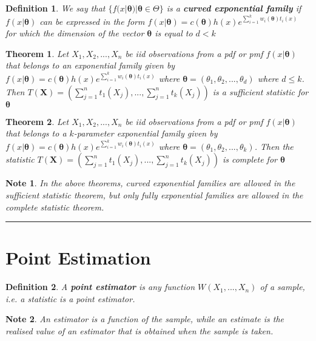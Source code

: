 \documentclass[14pt,twoside]{extreport}
\newcommand{\hhrule}{\vspace{1cm}\hrule\vspace{1cm}}
\theoremstyle{dotless}
\newtheorem*{defn}{Definition}
\newtheorem*{thm}{Theorem} %
\newtheorem*{note}{Note} %
\begin{document}
\begin{defn}
    We say that $\{ f(x|\bm{\theta}) | \bm{\theta} \in \Theta \}$ is a \textbf{curved exponential family} if $f(x|\bm{\theta})$ can be expressed in the form $f(x|\bm{\theta}) = c(\bm{\theta}) h(x) e^{\sum_{i=1}^k w_i(\bm{\theta}) t_i(x)}$ for which the dimension of the vector $\bm{\theta}$ is equal to $d < k$
\end{defn}

\begin{thm}
    Let $X_1, X_2, ...,  X_n$ be iid observations from a pdf or pmf $f(x|\bm{\theta})$ that belongs to an exponential family given by $f(x|\bm{\theta}) = c(\bm{\theta}) h(x) e^{\sum_{i=1}^k w_i(\bm{\theta}) t_i(x)}$ where $\bm{\theta} = (\theta_1, \theta_2, ..., \theta_d)$ where $d \leq k$. Then $T(\bm{X}) = \left (  \sum_{j=1}^n t_1(X_j), ..., \sum_{j=1}^n t_k(X_j) \right )$ is a sufficient statistic for $\bm{\theta}$
\end{thm}


\begin{thm}
    Let $X_1, X_2, ..., X_n$ be iid observations from a pdf or pmf $f(x|\bm{\theta})$ that belongs to a $k$-parameter exponential family given by $f(x|\bm{\theta}) = c(\bm{\theta}) h(x) e^{\sum_{i=1}^k w_i(\bm{\theta}) t_i(x)}$  where $\bm{\theta} = (\theta_1, \theta_2, ..., \theta_k)$. Then the statistic $T(\bm{X}) = \left ( \sum_{j=1}^n t_1(X_j), ..., \sum_{j=1}^n t_k(X_j) \right )$ is complete for $\bm{\theta}$
\end{thm}

\begin{note}
    In the above theorems, curved exponential families are allowed in the sufficient statistic theorem, but only fully exponential families are allowed in the complete statistic theorem.
\end{note}


\hhrule

\section*{Point Estimation}

\begin{defn}
A \textbf{point estimator} is any function $W(X_1, ..., X_n)$ of a sample, i.e. a statistic is a point estimator.
\end{defn}

\begin{note}
    An estimator is a function of the sample, while an estimate is the realised value of an estimator that is obtained when the sample is taken.
\end{note}
\end{document}
